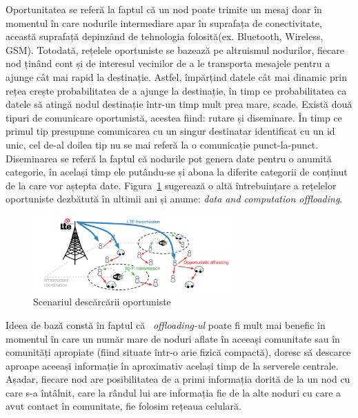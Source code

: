 \documentclass[12pt,a4paper]{report}
\begin{document}
Oportunitatea se referă la faptul că un nod poate trimite un mesaj doar în momentul în care nodurile intermediare apar în suprafața de conectivitate, această suprafață depinzând de tehnologia folosită(ex. Bluetooth, Wireless, GSM). Totodată, rețelele oportuniste se bazează pe altruismul nodurilor, fiecare nod ținând cont și de interesul vecinilor de a le transporta mesajele pentru a ajunge cât mai rapid la destinație. Astfel, împărțind datele cât mai dinamic prin rețea crește probabilitatea de a ajunge la destinație, în timp ce probabilitatea ca datele să atingă nodul destinație într-un timp mult prea mare, scade. Există două tipuri de comunicare oportunistă, acestea fiind: rutare și diseminare. În timp ce primul tip presupune comunicarea cu un singur destinatar identificat cu un id unic, cel de-al doilea tip nu se mai referă la o comunicație punct-la-punct. Diseminarea se referă la faptul că nodurile pot genera date pentru o anumită categorie, în același timp ele putându-se și abona la diferite categorii de conținut de la care vor aștepta date. 
Figura~\ref{fig:pic1} sugerează o altă întrebuințare a rețelelor oportuniste dezbătută în ultimii ani și anume: \textit{data and computation offloading}.
\begin{figure}[th]
\centering
\includegraphics[width=3in]{pics/ONs.png}
  \caption{Scenariul descărcării oportuniste\protect\footnotemark}
  \label{fig:pic1}
\end{figure}
Ideea de bază constă în faptul că ~\textit{offloading-ul} poate fi mult mai benefic în momentul în care un număr mare de noduri aflate în aceeași comunitate sau în comunități apropiate (fiind situate într-o arie fizică compactă), doresc să descarce aproape aceeași informație în aproximativ același timp de la serverele centrale. Așadar, fiecare nod are posibilitatea de a primi informația dorită de la un nod cu care s-a întâlnit, care la rândul lui are informația fie de la alte noduri cu care a avut contact în comunitate, fie folosim rețeaua celulară.
\end{document}
